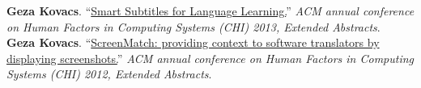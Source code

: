 \textbf{Geza Kovacs}. ``\href{http://up.csail.mit.edu/other-pubs/chi2013-smartsubs.pdf}{Smart Subtitles for Language Learning.}'' \emph{ACM annual conference on Human Factors in Computing Systems (CHI) 2013, Extended Abstracts}.\\ %

\textbf{Geza Kovacs}. ``\href{http://up.csail.mit.edu/other-pubs/chi2012-screenshots-for-translation-context.pdf}{ScreenMatch: providing context to software translators by displaying screenshots.}'' \emph{ACM annual conference on Human Factors in Computing Systems (CHI) 2012, Extended Abstracts}.\\ %
